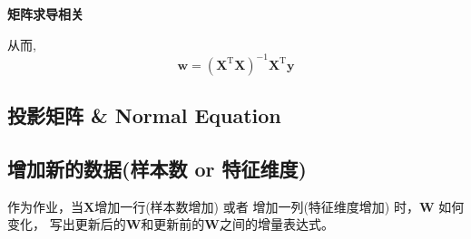 \documentclass[UTF8]{ctexart}
\begin{document}
\textbf{矩阵求导相关}
\begin{center} 
\end{center}
从而,
\begin{equation*}
    \boldsymbol{w}=\left(\boldsymbol{X}^{\mathrm{T}} \boldsymbol{X}\right)^{-1} \boldsymbol{X}^{\mathrm{T}} \boldsymbol{y}
\end{equation*}

\subsection{投影矩阵 \& Normal Equation}

\subsection{增加新的数据(样本数 or 特征维度)}
作为作业，当$\boldsymbol{X}$增加一行(样本数增加) 或者 增加一列(特征维度增加) 时，$\boldsymbol{W}$ 如何变化，
写出更新后的$\boldsymbol{W}$和更新前的$\boldsymbol{W}$之间的增量表达式。
\end{document}
